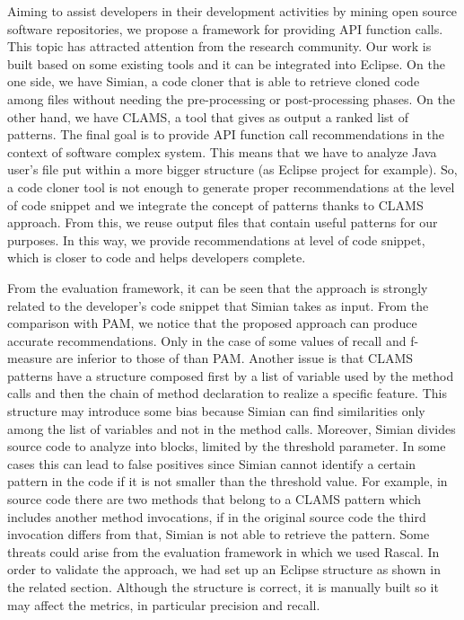 


Aiming to assist developers in their development activities by mining open source software repositories, we propose a framework for providing API function calls. This topic has attracted attention from the research community. Our work is built based on some existing tools and it can be integrated into Eclipse. On the one side, we have Simian, a code cloner that is able to retrieve cloned code among files without needing the pre-processing or post-processing phases. On the other hand, we have CLAMS, a tool that gives as output a ranked list of patterns. The final goal is to provide API function call recommendations in the context of software complex system. This means that we have to analyze Java user's file put within a more bigger structure (as Eclipse project for example). So, a code cloner tool is not enough to generate proper recommendations at the level of code snippet and we integrate the concept of patterns thanks to CLAMS approach. From this, we reuse output files that contain useful patterns for our purposes. In this way, we provide recommendations at level of code snippet, which is closer to code and helps developers complete.%


From the evaluation framework, it can be seen that the approach is strongly related to the developer's code snippet that Simian takes as input. From the comparison with PAM, we notice that the proposed approach can produce accurate recommendations. Only in the case of some values of recall and f-measure are inferior to those of than PAM. Another issue is that CLAMS patterns have a structure composed first by a list of variable used by the method calls and then the chain of method declaration to realize a specific feature. This structure may introduce some bias because Simian can find similarities only among the list of variables and not in the method calls. Moreover, Simian divides source code to analyze into blocks, limited by the threshold parameter. In some cases this can lead to false positives since Simian cannot identify a certain pattern in the code if it is not smaller than the threshold value. For example, in source code there are two methods that belong to a CLAMS pattern which includes another method invocations, if in the original source code the third invocation differs from that, Simian is not able to retrieve the pattern. Some threats could arise from the evaluation framework in which we used Rascal. In order to validate the approach, we had set up an Eclipse structure as shown in the related section. Although the structure is correct, it is manually built so it may affect the metrics, in particular precision and recall.
 
